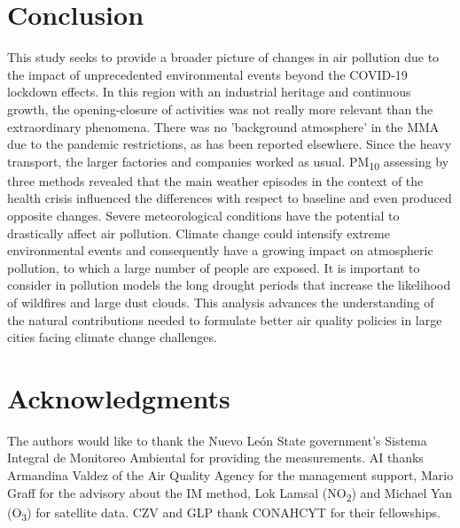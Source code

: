 \documentclass[preprint,12pt]{elsarticle}
\begin{document}
\section{Conclusion}
This study seeks to provide a broader picture of changes in air pollution due to the impact of unprecedented environmental events beyond the COVID-19 lockdown effects. In this region with an industrial heritage and continuous growth, the opening-closure of activities was not really more relevant than the extraordinary phenomena. There was no 'background atmosphere' in the MMA due to the pandemic restrictions, as has been reported elsewhere. Since the heavy transport, the larger factories and companies worked as usual. PM\textsubscript{10} assessing by three methods revealed that the main weather episodes in the context of the health crisis influenced the differences with respect to baseline and even produced opposite changes. Severe meteorological conditions have the potential to drastically affect air pollution. Climate change could intensify extreme environmental events and consequently have a growing impact on atmospheric pollution, to which a large number of people are exposed. It is important to consider in pollution models the long drought periods that increase the likelihood of wildfires and large dust clouds. This analysis advances the understanding of the natural contributions needed to formulate better air quality policies in large cities facing climate change challenges.
\section{Acknowledgments}
The authors would like to thank the Nuevo León State government’s Sistema Integral de Monitoreo Ambiental for providing the measurements. AI thanks Armandina Valdez of the Air Quality Agency for the management support, Mario Graff for the advisory about the IM method, Lok Lamsal (NO\textsubscript{2}) and Michael Yan (O\textsubscript{3}) for satellite data. CZV and GLP thank CONAHCYT for their fellowships. 






\end{document}
